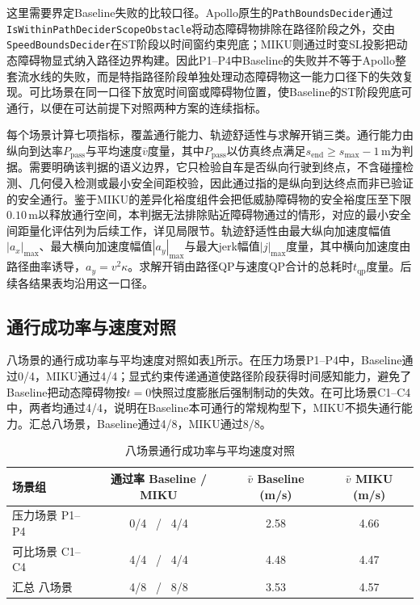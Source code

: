 \documentclass[a4paper,11pt]{ctexart}
\theoremstyle{definition}
\begin{document}
这里需要界定Baseline失败的比较口径。Apollo原生的\texttt{PathBoundsDecider}通过\texttt{IsWithinPathDeciderScopeObstacle}将动态障碍物排除在路径阶段之外，交由\texttt{SpeedBoundsDecider}在ST阶段以时间窗约束兜底；MIKU则通过时变SL投影把动态障碍物显式纳入路径边界构建。因此P1--P4中Baseline的失败并不等于Apollo整套流水线的失败，而是特指路径阶段单独处理动态障碍物这一能力口径下的失效复现。可比场景在同一口径下放宽时间窗或障碍物位置，使Baseline的ST阶段兜底可通行，以便在可达前提下对照两种方案的连续指标。

每个场景计算七项指标，覆盖通行能力、轨迹舒适性与求解开销三类。通行能力由纵向到达率$P_{\mathrm{pass}}$与平均速度$\bar v$度量，其中$P_{\mathrm{pass}}$以仿真终点满足$s_{\mathrm{end}} \geq s_{\max} - 1$\,m为判据。需要明确该判据的语义边界，它只检验自车是否纵向行驶到终点，不含碰撞检测、几何侵入检测或最小安全间距校验，因此通过指的是纵向到达终点而非已验证的安全通行。鉴于MIKU的差异化裕度组件会把低威胁障碍物的安全裕度压至下限$0.10$\,m以释放通行空间，本判据无法排除贴近障碍物通过的情形，对应的最小安全间距量化评估列为后续工作，详见局限节。轨迹舒适性由最大纵向加速度幅值$|a_x|_{\max}$、最大横向加速度幅值$|a_y|_{\max}$与最大jerk幅值$|j|_{\max}$度量，其中横向加速度由路径曲率诱导，$a_y = v^2 \kappa$。求解开销由路径QP与速度QP合计的总耗时$t_{\mathrm{qp}}$度量。后续各结果表均沿用这一口径。

\subsection{通行成功率与速度对照}
\label{subsec:exp_passrate}

八场景的通行成功率与平均速度对照如表\ref{tab:exp_pass}所示。在压力场景P1--P4中，Baseline通过0/4，MIKU通过4/4；显式约束传递通道使路径阶段获得时间感知能力，避免了Baseline把动态障碍物按$t=0$快照过度膨胀后强制制动的失效。在可比场景C1--C4中，两者均通过4/4，说明在Baseline本可通行的常规构型下，MIKU不损失通行能力。汇总八场景，Baseline通过4/8，MIKU通过8/8。

\begin{table}[htbp]
\centering
\caption{八场景通行成功率与平均速度对照}
\label{tab:exp_pass}
\small
\begin{tabular}{lccc}
\toprule
\textbf{场景组} & \textbf{通过率 Baseline / MIKU} & \textbf{$\bar v$ Baseline (m/s)} & \textbf{$\bar v$ MIKU (m/s)} \\
\midrule
压力场景 P1--P4 & 0/4 \ / \ 4/4 & 2.58 & 4.66 \\
可比场景 C1--C4 & 4/4 \ / \ 4/4 & 4.48 & 4.47 \\
\midrule
汇总 八场景 & 4/8 \ / \ 8/8 & 3.53 & 4.57 \\
\bottomrule
\end{tabular}
\end{table}
\end{document}
